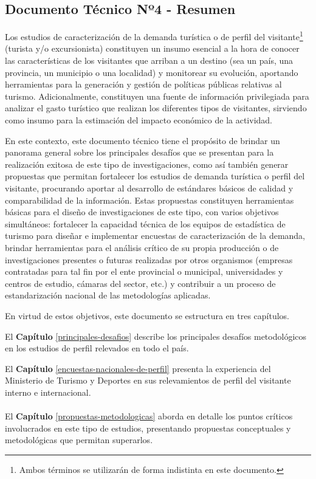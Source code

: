 \documentclass[
]{book}
\begin{document}
\hypertarget{documento-tuxe9cnico-nuxba4---resumen}{%
\subsection*{Documento Técnico Nº4 - Resumen}\label{documento-tuxe9cnico-nuxba4---resumen}}

Los estudios de caracterización de la demanda turística o de perfil del visitante\footnote{Ambos términos se utilizarán de forma indistinta en este documento.} (turista y/o excursionista) constituyen un insumo esencial a la hora de conocer las características de los visitantes que arriban a un destino (sea un país, una provincia, un municipio o una localidad) y monitorear su evolución, aportando herramientas para la generación y gestión de políticas públicas relativas al turismo. Adicionalmente, constituyen una fuente de información privilegiada para analizar el gasto turístico que realizan los diferentes tipos de visitantes, sirviendo como insumo para la estimación del impacto económico de la actividad.

En este contexto, este documento técnico tiene el propósito de brindar un panorama general sobre los principales desafíos que se presentan para la realización exitosa de este tipo de investigaciones, como así también generar propuestas que permitan fortalecer los estudios de demanda turística o perfil del visitante, procurando aportar al desarrollo de estándares básicos de calidad y comparabilidad de la información. Estas propuestas constituyen herramientas básicas para el diseño de investigaciones de este tipo, con varios objetivos simultáneos: fortalecer la capacidad técnica de los equipos de estadística de turismo para diseñar e implementar encuestas de caracterización de la demanda, brindar herramientas para el análisis crítico de su propia producción o de investigaciones presentes o futuras realizadas por otros organismos (empresas contratadas para tal fin por el ente provincial o municipal, universidades y centros de estudio, cámaras del sector, etc.) y contribuir a un proceso de estandarización nacional de las metodologías aplicadas.

En virtud de estos objetivos, este documento se estructura en tres capítulos.

El \textbf{Capítulo} \ref{principales-desafios} describe los principales desafíos metodológicos en los estudios de perfil relevados en todo el país.

El \textbf{Capítulo} \ref{encuestas-nacionales-de-perfil} presenta la experiencia del Ministerio de Turismo y Deportes en sus relevamientos de perfil del visitante interno e internacional.\\
~\\
El \textbf{Capítulo} \ref{propuestas-metodologicas} aborda en detalle los puntos críticos involucrados en este tipo de estudios, presentando propuestas conceptuales y metodológicas que permitan superarlos.
\end{document}

